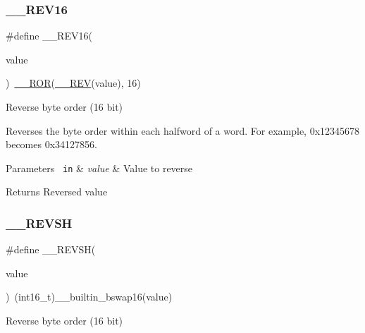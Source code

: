 \subsubsection{\texorpdfstring{\_\_REV16}{\_\_REV16}\hspace{0.1cm}{\footnotesize\ttfamily [2/2]}}
{\footnotesize\ttfamily \#define \+\_\+\+\_\+\+R\+E\+V16(\begin{DoxyParamCaption}\item[{}]{value }\end{DoxyParamCaption})~\mbox{\hyperlink{group___c_m_s_i_s___core___instruction_interface_gab16acb6456176f1e87a4f2724c2b6028}{\+\_\+\+\_\+\+R\+OR}}(\mbox{\hyperlink{group___c_m_s_i_s___core___instruction_interface_gadb92679719950635fba8b1b954072695}{\+\_\+\+\_\+\+R\+EV}}(value), 16)}



Reverse byte order (16 bit) 

Reverses the byte order within each halfword of a word. For example, 0x12345678 becomes 0x34127856. 
\begin{DoxyParams}[1]{Parameters}
\mbox{\texttt{ in}}  & {\em value} & Value to reverse \\
\hline
\end{DoxyParams}
\begin{DoxyReturn}{Returns}
Reversed value 
\end{DoxyReturn}
\mbox{\label{group___c_m_s_i_s___core___instruction_interface_gae580812686119c9c5cf3c11a7519a404}} 
\subsubsection{\texorpdfstring{\_\_REVSH}{\_\_REVSH}\hspace{0.1cm}{\footnotesize\ttfamily [1/2]}}
{\footnotesize\ttfamily \#define \+\_\+\+\_\+\+R\+E\+V\+SH(\begin{DoxyParamCaption}\item[{}]{value }\end{DoxyParamCaption})~(int16\+\_\+t)\+\_\+\+\_\+builtin\+\_\+bswap16(value)}



Reverse byte order (16 bit) 

